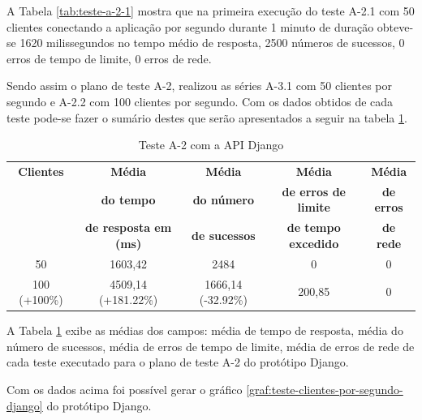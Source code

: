   A Tabela \ref{tab:teste-a-2-1} mostra que na primeira execução do teste A-2.1 com 50 clientes conectando a aplicação por segundo
  durante 1 minuto de duração obteve-se 1620 milissegundos no tempo médio de resposta,
  2500 números de sucessos, 0 erros de tempo de limite, 0 erros de rede.

  Sendo assim o plano de teste A-2, realizou as séries A-3.1 com 50 clientes por segundo e A-2.2 com 100 clientes por segundo.
  Com os dados obtidos de cada teste pode-se fazer o sumário destes que serão apresentados
  a seguir na tabela \ref{tab:sumario-resultado-plano-teste-a-2}.

  \begin{table}[H]
    \centering
    \footnotesize
    \setlength{\abovecaptionskip}{0pt}
    \setlength{\belowcaptionskip}{0pt}
    \caption[Teste A-2 com a API Django]{Teste A-2 com a API Django}
    \label{tab:sumario-resultado-plano-teste-a-2}
    \begin{tabular}{c|c|c|c|c}
      \hline \hline
      \textbf{Clientes} & \textbf{Média} &	\textbf{Média} & \textbf{Média} & \textbf{Média}  \\
      {}		& \textbf{do tempo} &   \textbf{do número } & \textbf{de erros de limite} & \textbf{de erros}  \\
      {}		& \textbf{de resposta em (ms) } &\textbf{de sucessos } & \textbf{de tempo excedido} & \textbf{de rede} \\
      \hline \hline
      50 &			1603,42 & 				2484 & 					0 &					0 \\
      100 (+100\%)&		4509,14 (+181.22\%) & 			1666,14 (-32.92\%) & 			200,85  &				0 \\
      \hline \hline
    \end{tabular}
  \end{table}

  A Tabela \ref{tab:sumario-resultado-plano-teste-a-2} exibe as médias dos campos: média de tempo de resposta,
  média do número de sucessos, média de erros de tempo de limite, média de erros de rede de cada teste executado
  para o plano de teste A-2 do protótipo Django.

  Com os dados acima foi possível gerar o gráfico \ref{graf:teste-clientes-por-segundo-django} do
  protótipo Django.

